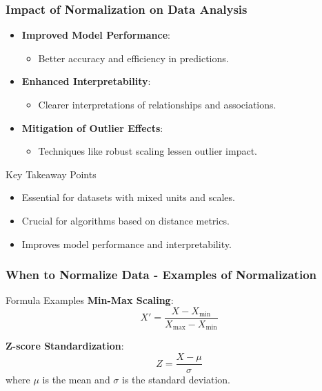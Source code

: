 \documentclass[aspectratio=169]{beamer}
\begin{document}
\begin{frame}[fragile]
    \frametitle{Impact of Normalization on Data Analysis}
    \begin{itemize}
        \item \textbf{Improved Model Performance}: 
        \begin{itemize}
            \item Better accuracy and efficiency in predictions.
        \end{itemize}
        \item \textbf{Enhanced Interpretability}: 
        \begin{itemize}
            \item Clearer interpretations of relationships and associations.
        \end{itemize}
        \item \textbf{Mitigation of Outlier Effects}: 
        \begin{itemize}
            \item Techniques like robust scaling lessen outlier impact.
        \end{itemize}
    \end{itemize}
    \begin{block}{Key Takeaway Points}
        \begin{itemize}
            \item Essential for datasets with mixed units and scales.
            \item Crucial for algorithms based on distance metrics.
            \item Improves model performance and interpretability.
        \end{itemize}
    \end{block}
\end{frame}

\begin{frame}[fragile]
    \frametitle{When to Normalize Data - Examples of Normalization}
    \begin{block}{Formula Examples}
        \textbf{Min-Max Scaling}:
        \begin{equation}
        X' = \frac{X - X_{\text{min}}}{X_{\text{max}} - X_{\text{min}}}
        \end{equation}
        
        \textbf{Z-score Standardization}:
        \begin{equation}
        Z = \frac{X - \mu}{\sigma}
        \end{equation}
        where $\mu$ is the mean and $\sigma$ is the standard deviation.
    \end{block}
\end{frame}
\end{document}
